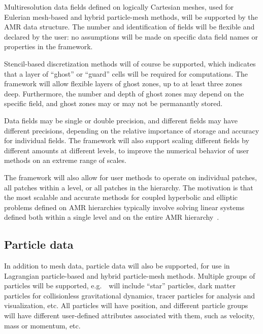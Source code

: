 \documentclass[10pt]{article}
\begin{document}
Multiresolution data fields defined on logically Cartesian meshes,
used for Eulerian mesh-based and hybrid particle-mesh methods, will be
supported by the AMR data structure.  The number and identification of
fields will be flexible and declared by the user: no assumptions will
be made on specific data field names or properties in the framework.

Stencil-based discretization methods will of course be supported,
which indicates that a layer of ``ghost'' or ``guard'' cells will be
required for computations.  The framework will allow flexible layers
of ghost zones, up to at least three zones deep.  Furthermore, the number and
depth of ghost zones may depend on the specific field, and ghost zones
may or may not be permanantly stored.

Data fields may be single or double precision, and different fields
may have different precisions, depending on the relative importance of
storage and accuracy for individual fields.  The framework will also
support scaling different fields by different amounts at different
levels, to improve the numerical behavior of user methods on an
extreme range of scales.

The framework will also allow for user methods to operate on
individual patches, all patches within a level, or all patches in the
hierarchy.  The motivation is that the most scalable and accurate
methods for coupled hyperbolic and elliptic problems defined on AMR
hierarchies typically involve solving linear systems defined both
within a single level and on the entire AMR hierarchy~\cite{MiCo07}.


\subsection{Particle data} \label{ss:require-particles}

In addition to mesh data, particle data will also be supported, for
use in Lagrangian particle-based and hybrid particle-mesh methods.
Multiple groups of particles will be supported, e.g.~\enzoii\ will
include ``star'' particles, dark matter particles for collisionless
gravitational dynamics, tracer particles for analysis and
visualization, etc.  All particles will have position, and different particle
groups will have different user-defined attributes associated with them, such
as velocity, mass or momentum, etc.
\end{document}
